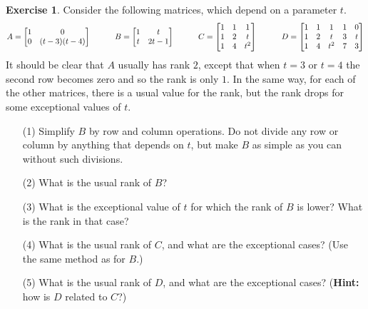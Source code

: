 \documentclass[a4paper]{amsart}
\theoremstyle{definition}
\newtheorem{exercise}{Exercise}
\begin{document}
\begin{exercise}\label{ex-rank-iii}
 Consider the following matrices, which depend on a parameter $t$. 
 \[ A = \left[\begin{matrix} 1 & 0 \\ 
             0 & (t-3)(t-4) \end{matrix}\right] \hspace{3em}
    B = \left[\begin{matrix} 1 & t \\
             t & 2t-1 \end{matrix}\right] \hspace{3em}
    C = \left[\begin{matrix} 1 & 1 & 1 \\
             1 & 2 & t \\
             1 & 4 & t^2 \end{matrix}\right] \hspace{3em}
    D = \left[\begin{matrix} 1 & 1 & 1   & 1 & 0 \\
             1 & 2 & t   & 3 & t \\
             1 & 4 & t^2 & 7 & 3 \end{matrix}\right]
 \]
 It should be clear that $A$ usually has rank $2$, except that when
 $t=3$ or $t=4$ the second row becomes zero and so the rank is only
 $1$.  In the same way, for each of the other matrices, there is a
 usual value for the rank, but the rank drops for some exceptional
 values of $t$.
 \begin{itemize}
  \item[(1)] Simplify $B$ by row and column operations.  Do not divide
   any row or column by anything that depends on $t$, but make $B$ as
   simple as you can without such divisions.
  \item[(2)] What is the usual rank of $B$?
  \item[(3)] What is the exceptional value of $t$ for which the rank
   of $B$ is lower?  What is the rank in that case?
  \item[(4)] What is the usual rank of $C$, and what are the
   exceptional cases?  (Use the same method as for $B$.)
  \item[(5)] What is the usual rank of $D$, and what are the
   exceptional cases?  (\textbf{Hint:} how is $D$ related to $C$?)
 \end{itemize}
\end{exercise}
\end{document}
